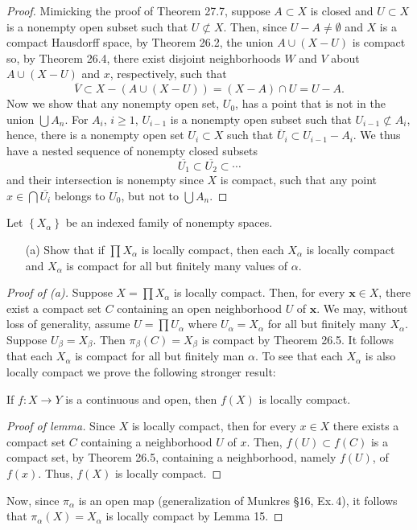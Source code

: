\begin{proof}
Mimicking the proof of Theorem 27.7, suppose $A\subset X$ is
closed and $U\subset X$ is a nonempty open subset such that
$U\nsubset X$. Then, since $U-A\neq\emptyset$ and $X$ is a
compact Hausdorff space, by Theorem 26.2, the union $A\cup (X-U)$
is compact so, by Theorem 26.4, there exist disjoint
neighborhoods $W$ and $V$ about $A\cup(X-U)$ and $x$,
respectively, such that
\[\overline V\subset X-(A\cup(X-U))=(X-A)\cap U=U-A.\]
Now we show that any nonempty open set, $U_0$, has a point that
is not in the union $\bigcup A_n$. For $A_i$, $i\geq 1$,
$U_{i-1}$ is a nonempty open subset such that $U_{i-1}\nsubset
A_i$, hence, there is a nonempty open set $U_i\subset X$ such
that $\overline U_i\subset U_{i-1}-A_i$. We thus have a nested
sequence of nonempty closed subsets
\[
\overline{U_1}\subset\overline{U_2}\subset\cdots
\]
and their intersection is nonempty since $X$ is compact, such
that any point $x\in\bigcap\overline{U_i}$ belongs to $U_0$, but
not to $\bigcup A_n$.
\end{proof}
\newpage
\begin{problem}[Munkres \S29, Ex.\,2(a)]
Let $\left\{X_\alpha\right\}$ be an indexed family of nonempty
spaces.
\begin{itemize}
\item[(a)] Show that if $\prod X_\alpha$ is locally compact, then
  each $X_\alpha$ is locally compact and $X_\alpha$ is compact
  for all but finitely many values of $\alpha$.
\end{itemize}
\end{problem}
\begin{proof}[Proof of (a)]
Suppose $X=\prod X_\alpha$ is locally compact. Then, for every
$\mathbf{x}\in X$, there exist a compact set $C$ containing an open
neighborhood $U$ of $\mathbf{x}$. We may, without loss of generality,
assume $U=\prod U_\alpha$ where $U_\alpha=X_\alpha$ for all but
finitely many $X_\alpha$. Suppose $U_\beta=X_\beta$. Then
$\pi_\beta(C)=X_\beta$ is compact by Theorem 26.5. It follows that
each $X_\alpha$ is compact for all but finitely man $\alpha$. To see
that each $X_\alpha$ is also locally compact we prove the following
stronger result:
\begin{lemma}[Munkres \S20, Ex.\,3]
If $f\colon X\to Y$ is a continuous and open, then $f(X)$ is locally
compact.
\end{lemma}
\begin{proof}[Proof of lemma]
\renewcommand\qedsymbol{$\clubsuit$}
Since $X$ is locally compact, then for every $x\in X$ there exists a
compact set $C$ containing a neighborhood $U$ of $x$. Then,
$f(U)\subset f(C)$ is a compact set, by Theorem 26.5, containing a
neighborhood, namely $f(U)$, of $f(x)$. Thus, $f(X)$ is locally compact.
\end{proof}
Now, since $\pi_\alpha$ is an open map (generalization of Munkres
\S16, Ex.\,4), it follows that $\pi_\alpha(X)=X_\alpha$ is locally
compact by Lemma 15.
\end{proof}
